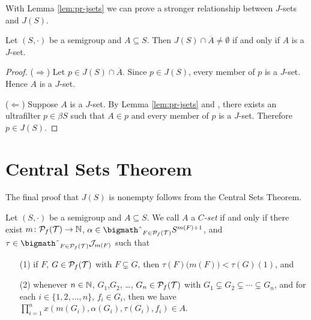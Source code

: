 With Lemma \ref{lem:pr-jsets} we can prove a stronger relationship between $J$-sets and $J(S)$.

\begin{thm}
  \label{thm:jsets-ideal}
  Let $(S, \cdot)$ be a semigroup and $A \subseteq S$.
  Then $J(S) \cap \overline{A} \ne \emptyset$ if and only if $A$ is a $J$-set.
\end{thm}
\begin{proof}
  ($\Rightarrow$)
  Let $p \in J(S) \cap \overline{A}$. 
  Since $p \in J(S)$, every member of $p$ is a $J$-set.
  Hence $A$ is a $J$-set.

  ($\Leftarrow$)
  Suppose $A$ is a $J$-set. 
  By Lemma \ref{lem:pr-jsets} and \cite[Theorem 3.11]{Hindman:1998fk}, there exists an ultrafilter $p \in \beta S$ such that $A \in p$ and every member of $p$ is a $J$-set. 
  Therefore $p \in J(S)$.
\end{proof}


\section{Central Sets Theorem}
The final proof that $J(S)$ is nonempty follows from the Central Sets Theorem.
\begin{defn}
  Let $(S, \cdot)$ be a semigroup and $A \subseteq S$.
  We call $A$ a \textsl{$C$-set} if and only if there exist $m \colon \mathcal{P}_f(\mathcal{T}) \to \mathbb{N}$, $\alpha \in \bigtimes_{F \in \Pf(\calT)} S^{m(F)+1}$, and $\tau \in \bigtimes_{F \in \Pf(\calT)} \calJ_{m(F)}$ such that 
  \begin{itemize}
    \item[(1)] if $F$, $G \in \mathcal{P}_f(\mathcal{T})$ with $F \subsetneq G$, then $\tau(F)\bigl( m(F) \bigr) < \tau(G)(1)$, and
    \item[(2)] whenever $n \in \mathbb{N}$, $G_1$,$G_2$, \dots, $G_n \in \mathcal{P}_f(\mathcal{T})$  with $G_1 \subsetneq G_2 \subsetneq \cdots \subsetneq G_n$, and for each $i \in \{1, 2, \ldots, n\}$, $f_i \in G_i$, then we have $\prod_{i=1}^n x(m(G_i), \alpha(G_i), \tau(G_i), f_i) \in A$.
  \end{itemize}
\end{defn}

